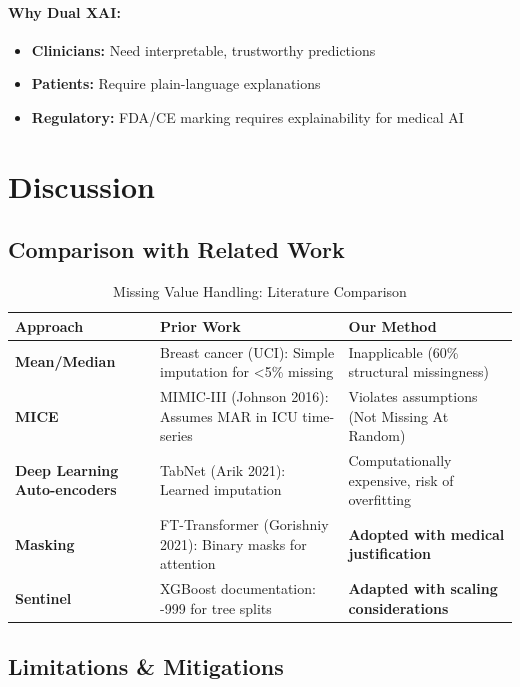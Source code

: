 \documentclass[12pt,a4paper]{article}
\begin{document}
\paragraph{Why Dual XAI:}
\begin{itemize}
    \item \textbf{Clinicians:} Need interpretable, trustworthy predictions
    \item \textbf{Patients:} Require plain-language explanations
    \item \textbf{Regulatory:} FDA/CE marking requires explainability for medical AI
\end{itemize}

\section{Discussion}

\subsection{Comparison with Related Work}

\begin{table}[H]
\centering
\caption{Missing Value Handling: Literature Comparison}
\begin{tabular}{p{4cm}p{4.5cm}p{4.5cm}}
\toprule
\textbf{Approach} & \textbf{Prior Work} & \textbf{Our Method} \\
\midrule
\textbf{Mean/Median} & 
Breast cancer (UCI): Simple imputation for <5\% missing & 
Inapplicable (60\% structural missingness) \\
\midrule
\textbf{MICE} & 
MIMIC-III (Johnson 2016): Assumes MAR in ICU time-series & 
Violates assumptions (Not Missing At Random) \\
\midrule
\textbf{Deep Learning Auto-encoders} & 
TabNet (Arik 2021): Learned imputation & 
Computationally expensive, risk of overfitting \\
\midrule
\textbf{Masking} & 
FT-Transformer (Gorishniy 2021): Binary masks for attention & 
\textbf{Adopted with medical justification} \\
\midrule
\textbf{Sentinel} & 
XGBoost documentation: -999 for tree splits & 
\textbf{Adapted with scaling considerations} \\
\bottomrule
\end{tabular}
\end{table}

\subsection{Limitations \& Mitigations}
\end{document}
